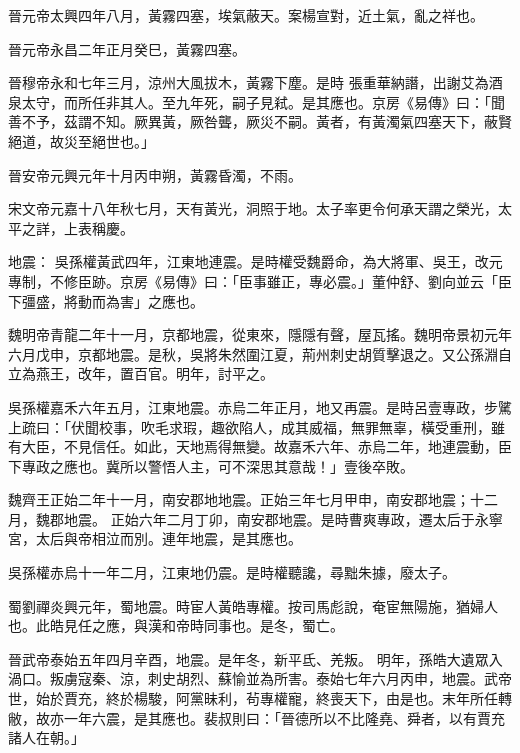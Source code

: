 \begin{pinyinscope}
 晉元帝太興四年八月，黃霧四塞，埃氣蔽天。案楊宣對，近土氣，亂之祥也。



 晉元帝永昌二年正月癸巳，黃霧四塞。



 晉穆帝永和七年三月，涼州大風拔木，黃霧下塵。是時
 張重華納譖，出謝艾為酒泉太守，而所任非其人。至九年死，嗣子見弒。是其應也。京房《易傳》曰：「聞善不予，茲謂不知。厥異黃，厥咎聾，厥災不嗣。黃者，有黃濁氣四塞天下，蔽賢絕道，故災至絕世也。」



 晉安帝元興元年十月丙申朔，黃霧昏濁，不雨。



 宋文帝元嘉十八年秋七月，天有黃光，洞照于地。太子率更令何承天謂之榮光，太平之詳，上表稱慶。



 地震：
 吳孫權黃武四年，江東地連震。是時權受魏爵命，為大將軍、吳王，改元專制，不修臣跡。京房《易傳》曰：「臣事雖正，專必震。」董仲舒、劉向並云「臣下彊盛，將動而為害」之應也。



 魏明帝青龍二年十一月，京都地震，從東來，隱隱有聲，屋瓦搖。魏明帝景初元年六月戊申，京都地震。是秋，吳將朱然圍江夏，荊州刺史胡質擊退之。又公孫淵自立為燕王，改年，置百官。明年，討平之。



 吳孫權嘉禾六年五月，江東地震。赤烏二年正月，地又再震。是時呂壹專政，步騭上疏曰：「伏聞校事，吹毛求瑕，趣欲陷人，成其威福，無罪無辜，橫受重刑，雖有大臣，不見信任。如此，天地焉得無變。故嘉禾六年、赤烏二年，地連震動，臣下專政之應也。冀所以警悟人主，可不深思其意哉！」壹後卒敗。



 魏齊王正始二年十一月，南安郡地地震。正始三年七月甲申，南安郡地震；十二月，魏郡地震。
 正始六年二月丁卯，南安郡地震。是時曹爽專政，遷太后于永寧宮，太后與帝相泣而別。連年地震，是其應也。



 吳孫權赤烏十一年二月，江東地仍震。是時權聽讒，尋黜朱據，廢太子。



 蜀劉禪炎興元年，蜀地震。時宦人黃皓專權。按司馬彪說，奄宦無陽施，猶婦人也。此皓見任之應，與漢和帝時同事也。是冬，蜀亡。



 晉武帝泰始五年四月辛酉，地震。是年冬，新平氐、羌叛。
 明年，孫皓大遺眾入渦口。叛虜寇秦、涼，刺史胡烈、蘇愉並為所害。泰始七年六月丙申，地震。武帝世，始於賈充，終於楊駿，阿黨昧利，茍專權寵，終喪天下，由是也。末年所任轉敝，故亦一年六震，是其應也。裴叔則曰：「晉德所以不比隆堯、舜者，以有賈充諸人在朝。」




\end{pinyinscope}
